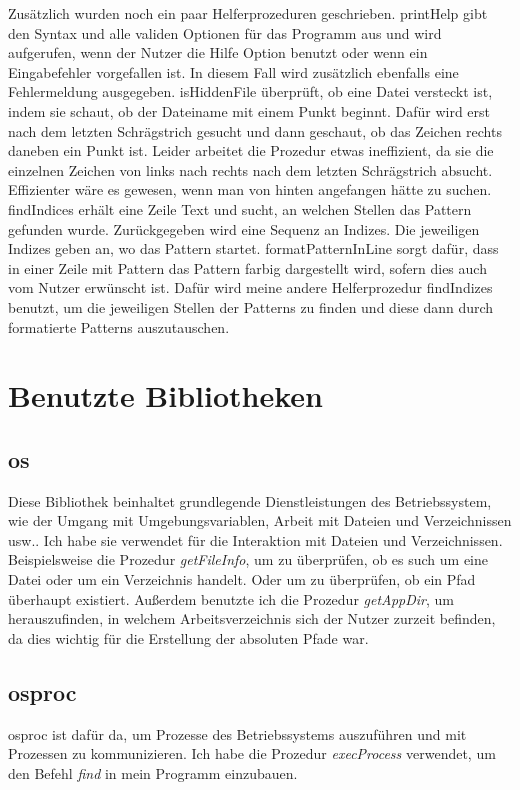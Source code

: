 \documentclass[11pt]{report}
\begin{document}
Zusätzlich wurden noch ein paar Helferprozeduren geschrieben.
\newline
printHelp gibt den Syntax und alle validen Optionen für das Programm aus und wird aufgerufen, wenn der Nutzer die Hilfe Option benutzt oder wenn ein Eingabefehler vorgefallen ist. In diesem Fall wird zusätzlich ebenfalls eine Fehlermeldung ausgegeben.
\newline
isHiddenFile überprüft, ob eine Datei versteckt ist, indem sie schaut, ob der Dateiname mit einem Punkt beginnt. Dafür wird erst nach dem letzten Schrägstrich gesucht und dann geschaut, ob das Zeichen rechts daneben ein Punkt ist. Leider arbeitet die Prozedur etwas ineffizient, da sie die einzelnen Zeichen von links nach rechts nach dem letzten Schrägstrich absucht. Effizienter wäre es gewesen, wenn man von hinten angefangen hätte zu suchen.
\newline
findIndices erhält eine Zeile Text und sucht, an welchen Stellen das Pattern gefunden wurde. Zurückgegeben wird eine Sequenz an Indizes. Die jeweiligen Indizes geben an, wo das Pattern startet.
\newline
formatPatternInLine sorgt dafür, dass in einer Zeile mit Pattern das Pattern farbig dargestellt wird, sofern dies auch vom Nutzer erwünscht ist. Dafür wird meine andere Helferprozedur findIndizes benutzt, um die jeweiligen Stellen der Patterns zu finden und diese dann durch formatierte Patterns auszutauschen.


\section{Benutzte Bibliotheken}
\subsection{os}
Diese Bibliothek beinhaltet grundlegende Dienstleistungen des Betriebssystem, wie der Umgang mit Umgebungsvariablen, Arbeit mit Dateien und Verzeichnissen usw..
Ich habe sie verwendet für die Interaktion mit Dateien und Verzeichnissen. Beispielsweise die Prozedur \emph{getFileInfo}, um zu überprüfen, ob es such um eine Datei oder um ein Verzeichnis handelt. Oder um zu überprüfen, ob ein Pfad überhaupt existiert. Außerdem benutzte ich die Prozedur \emph{getAppDir}, um herauszufinden, in welchem Arbeitsverzeichnis sich der Nutzer zurzeit befinden, da dies wichtig für die Erstellung der absoluten Pfade war.
\subsection{osproc}
osproc ist dafür da, um Prozesse des Betriebssystems auszuführen und mit Prozessen zu kommunizieren.
Ich habe die Prozedur \emph{execProcess} verwendet, um den Befehl \emph{find} in mein Programm einzubauen.
\end{document}
